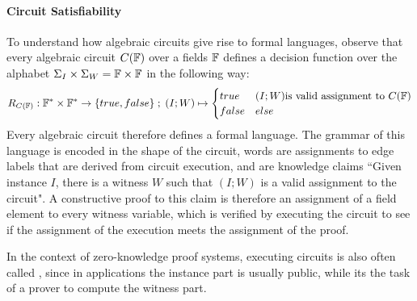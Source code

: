 \paragraph{Circuit Satisfiability}
\label{circuit-satisfiability} To understand how algebraic circuits give rise to formal languages, observe that every algebraic circuit $C(\mathbb{F})$ over a fields $\mathbb{F}$ defines a decision function over the alphabet $\Sigma_I \times \Sigma_W = \mathbb{F} \times \mathbb{F}$ in the following way:
\begin{equation}
R_{C(\mathbb{F})} : \mathbb{F}^* \times \mathbb{F}^* \to \{true, false\}\;;\;
(I;W) \mapsto
\begin{cases}
true & (I;W) \text{is valid assignment to } C(\mathbb{F})\\
false & else
\end{cases}
\end{equation}
Every algebraic circuit therefore defines a formal language. The grammar of this language is encoded in the shape of the circuit, words are assignments to edge labels that are derived from circuit execution, and  are knowledge claims ``Given instance $I$, there is a witness $W$ such that $(I;W)$ is a valid assignment to the circuit". A constructive proof to this claim is therefore an assignment of a field element to every witness variable, which is verified by executing the circuit to see if the assignment of the execution meets the assignment of the proof. 

In the context of zero-knowledge proof systems, executing circuits is also often called , since in applications the instance part is usually public, while its the task of a prover to compute the witness part.

